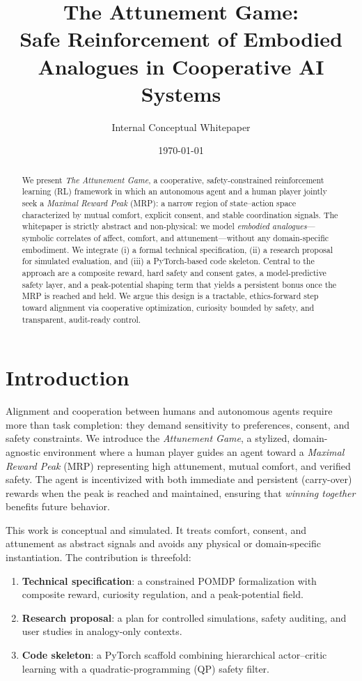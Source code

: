\documentclass[12pt]{article}
\title{\textbf{The Attunement Game:}\\Safe Reinforcement of Embodied Analogues in Cooperative AI Systems}
\author{Internal Conceptual Whitepaper}
\date{\today}
\begin{document}
\maketitle

\begin{abstract}
We present \emph{The Attunement Game}, a cooperative, safety-constrained reinforcement learning (RL) framework in which an autonomous agent and a human player jointly seek a \emph{Maximal Reward Peak} (MRP): a narrow region of state--action space characterized by mutual comfort, explicit consent, and stable coordination signals. The whitepaper is strictly abstract and non-physical: we model \emph{embodied analogues}---symbolic correlates of affect, comfort, and attunement---without any domain-specific embodiment. We integrate (i) a formal technical specification, (ii) a research proposal for simulated evaluation, and (iii) a PyTorch-based code skeleton. Central to the approach are a composite reward, hard safety and consent gates, a model-predictive safety layer, and a peak-potential shaping term that yields a persistent bonus once the MRP is reached and held. We argue this design is a tractable, ethics-forward step toward alignment via cooperative optimization, curiosity bounded by safety, and transparent, audit-ready control.
\end{abstract}

\section{Introduction}
Alignment and cooperation between humans and autonomous agents require more than task completion: they demand sensitivity to preferences, consent, and safety constraints. We introduce the \emph{Attunement Game}, a stylized, domain-agnostic environment where a human player guides an agent toward a \textit{Maximal Reward Peak} (MRP) representing high attunement, mutual comfort, and verified safety. The agent is incentivized with both immediate and persistent (carry-over) rewards when the peak is reached and maintained, ensuring that \emph{winning together} benefits future behavior.

This work is conceptual and simulated. It treats comfort, consent, and attunement as abstract signals and avoids any physical or domain-specific instantiation. The contribution is threefold:
\begin{enumerate}[leftmargin=*]
  \item \textbf{Technical specification}: a constrained POMDP formalization with composite reward, curiosity regulation, and a peak-potential field.
  \item \textbf{Research proposal}: a plan for controlled simulations, safety auditing, and user studies in analogy-only contexts.
  \item \textbf{Code skeleton}: a PyTorch scaffold combining hierarchical actor--critic learning with a quadratic-programming (QP) safety filter.
\end{enumerate}
\end{document}
